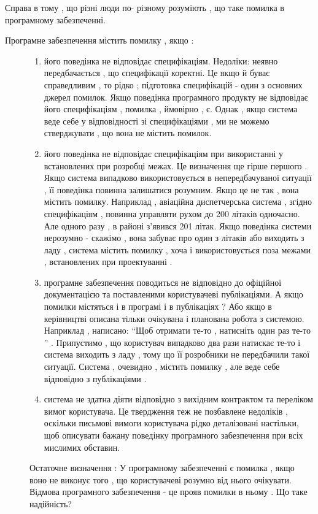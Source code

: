Справа в тому , що різні люди по- різному розуміють , що таке помилка в програмному забезпеченні.
\begin{description}
\item[{Програмне забезпечення містить помилку , якщо :}] \leavevmode\begin{enumerate}
\item {} 
його поведінка не відповідає специфікаціям. Недоліки: неявно передбачається , що специфікації коректні. Це якщо й буває справедливим , то рідко ; підготовка специфікацій - один з основних джерел помилок. Якщо поведінка програмного продукту не відповідає його специфікаціям , помилка , ймовірно , є. Однак , якщо система веде себе у відповідності зі специфікаціями , ми не можемо стверджувати , що вона не містить помилок.

\item {} 
його поведінка не відповідає специфікаціям при використанні у встановлених при розробці межах. Це визначення ще гірше першого . Якщо система випадково використовується в непередбачуваної ситуації , її поведінка повинна залишатися розумним. Якщо це не так , вона містить помилку. Наприклад , авіаційна диспетчерська система , згідно специфікаціям , повинна управляти рухом до 200 літаків одночасно. Але одного разу , в районі з'явився 201 літак. Якщо поведінка системи нерозумно - скажімо , вона забуває про один з літаків або виходить з ладу , система містить помилку , хоча і використовується поза межами , встановлених при проектуванні .

\item {} 
програмне забезпечення поводиться не відповідно до офіційної документацією та поставленими користувачеві публікаціями. А якщо помилки містяться і в програмі і в публікаціях ? Або якщо в керівництві описана тільки очікувана і планована робота з системою. Наприклад , написано: ``Щоб отримати те-то , натисніть один раз те-то '' . Припустимо , що користувач випадково два рази натискає те-то і система виходить з ладу , тому що її розробники не передбачили такої ситуації. Система , очевидно , містить помилку , але веде себе відповідно з публікаціями .

\item {} 
система не здатна діяти відповідно з вихідним контрактом та переліком вимог користувача.    Це твердження теж не позбавлене недоліків , оскільки письмові вимоги користувача рідко деталізовані настільки, щоб описувати бажану поведінку програмного забезпечення при всіх мислимих обставин.

\end{enumerate}

Остаточне визначення :
У програмному забезпеченні є помилка , якщо воно не виконує того , що користувачеві розумно від нього очікувати. Відмова програмного забезпечення - це прояв помилки в ньому .
Що таке надійність?

\end{description}

